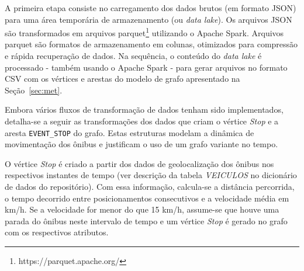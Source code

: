 A primeira etapa consiste no carregamento dos dados brutos (em formato JSON) para uma área temporária de armazenamento (ou \emph{data lake}). Os arquivos JSON são transformados em arquivos parquet\footnote{https://parquet.apache.org/} \cite{Boufea:17} utilizando o Apache Spark. Arquivos parquet são formatos de armazenamento em colunas, otimizados para compressão e rápida recuperação de dados. 
Na sequência, o conteúdo do \emph{data lake} é processado - também usando o Apache Spark - para gerar arquivos no formato CSV com os vértices e arestas do modelo de grafo apresentado na Seção~\ref{sec:met}. 

Embora vários fluxos de transformação de dados tenham sido implementados, detalha-se a seguir as transformações dos dados que criam o vértice \emph{Stop} e a aresta \texttt{EVENT\_STOP} do grafo. Estas estruturas modelam a dinâmica de movimentação dos ônibus e justificam o uso de um grafo variante no tempo.


O vértice \emph{Stop} é criado a partir dos dados de geolocalização dos ônibus nos respectivos instantes de tempo (ver descrição da tabela \emph{VEICULOS} no dicionário de dados do repositório). Com essa informação, calcula-se a distância percorrida, o tempo decorrido entre posicionamentos consecutivos e a velocidade média em km/h. Se a velocidade for menor do que 15 km/h, assume-se que houve uma parada do ônibus neste intervalo de tempo e um vértice \emph{Stop} é gerado no grafo com os respectivos atributos.


